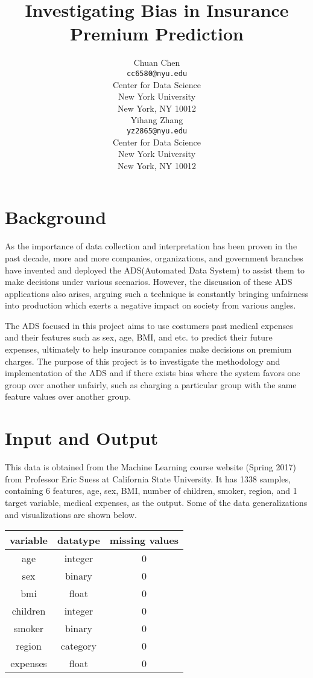 \documentclass[10pt]{article}
\title{Investigating Bias in Insurance Premium Prediction}
\author{
  Chuan Chen \\
  \texttt{cc6580@nyu.edu} \\
  Center for Data Science\\
  New York University\\
  New York, NY 10012 \\

   \And
  Yihang Zhang\\
  \texttt{yz2865@nyu.edu} \\
  Center for Data Science\\
  New York University\\
  New York, NY 10012 \\
}
\begin{document}
\maketitle

\setcounter{page}{1}

\section{Background}


As the importance of data collection and interpretation has been proven in the past decade, more and more companies, organizations, and government branches have invented and deployed the ADS(Automated Data System) to assist them to make decisions under various scenarios. However, the discussion of these ADS applications also arises, arguing such a technique is constantly bringing unfairness into production which exerts a negative impact on society from various angles. 

The ADS focused in this project aims to use costumers past medical expenses and their features such as sex, age, BMI, and etc. to predict their future expenses, ultimately to help insurance companies make decisions on premium charges. The purpose of this project is to investigate the methodology and implementation of the ADS and if there exists bias where the system favors one group over another unfairly, such as charging a particular group with the same feature values over another group.

\section{Input and Output}

This data is obtained from the Machine Learning course website (Spring 2017) from Professor Eric Suess at California State University. It has 1338 samples, containing 6 features, age, sex, BMI, number of children, smoker, region, and 1 target variable, medical expenses, as the output. Some of the data generalizations and visualizations are shown below.
\begin{center}
\begin{tabular}{c|c | c}
\label{tabu:data}
variable & datatype & missing values\\
\hline
\hline
age & integer & 0\\
\hline
sex & binary & 0\\
\hline
bmi & float & 0\\
\hline
children & integer & 0\\
\hline
smoker & binary & 0\\
\hline
region & category & 0\\
\hline
expenses & float & 0 
\end{tabular}
\end{center}
\end{document}
